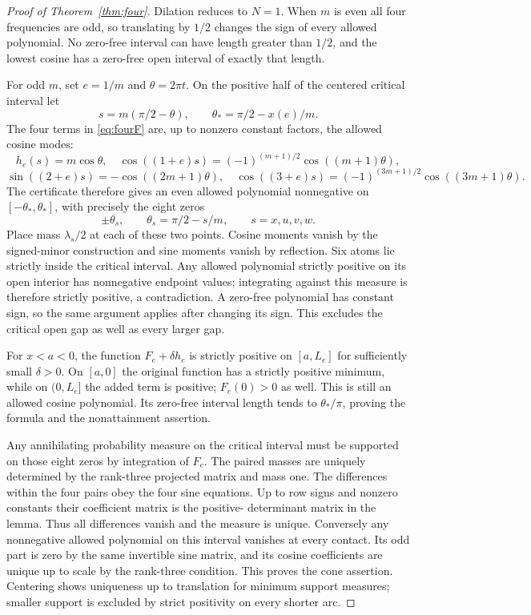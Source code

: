 \begin{proof}[Proof of Theorem~\ref{thm:four}]
Dilation reduces to $N=1$. When $m$ is even all four frequencies are odd,
so translating by $1/2$ changes the sign of every allowed polynomial.
No zero-free interval can have length greater than $1/2$, and the lowest
cosine has a zero-free open interval of exactly that length.

For odd $m$, set $e=1/m$ and $\theta=2\pi t$. On the positive half of
the centered critical interval let
\[
 s=m(\pi/2-\theta),\qquad
 \theta_* =\pi/2-x(e)/m.
\]
The four terms in \eqref{eq:fourF} are, up to nonzero constant factors,
the allowed cosine modes:
\[
 h_e(s)=m\cos\theta,
 \quad \cos((1+e)s)=(-1)^{(m+1)/2}\cos((m+1)\theta),
\]
\[
 \sin((2+e)s)=-\cos((2m+1)\theta),
 \quad \cos((3+e)s)=(-1)^{(3m+1)/2}\cos((3m+1)\theta).
\]
The certificate therefore gives an even allowed polynomial nonnegative on
$[-\theta_*,\theta_*]$, with precisely the eight zeros
\[
 \pm\theta_s,\qquad \theta_s=\pi/2-s/m,
 \qquad s=x,u,v,w.
\]
Place mass $\lambda_s/2$ at each of these two points. Cosine moments vanish
by the signed-minor construction and sine moments vanish by reflection.
Six atoms lie strictly inside the critical interval. Any allowed polynomial
strictly positive on its open interior has nonnegative endpoint values;
integrating against this measure is therefore strictly positive, a
contradiction. A zero-free polynomial has constant sign, so the same
argument applies after changing its sign. This excludes the critical open
gap as well as every larger gap.

For $x<a<0$, the function $F_e+\delta h_e$ is strictly positive on
$[a,L_e]$ for sufficiently small $\delta>0$. On $[a,0]$ the original
function has a strictly positive minimum, while on $(0,L_e]$ the added
term is positive; $F_e(0)>0$ as well. This is still an allowed cosine
polynomial. Its zero-free interval length tends to $\theta_*/\pi$, proving
the formula and the nonattainment assertion.

Any annihilating probability measure on the critical interval must be
supported on those eight zeros by integration of $F_e$. The paired masses
are uniquely determined by the rank-three projected matrix and mass one.
The differences within the four pairs obey the four sine equations. Up to
row signs and nonzero constants their coefficient matrix is the positive-
determinant matrix in the lemma. Thus all differences vanish and the
measure is unique. Conversely any nonnegative allowed polynomial on this
interval vanishes at every contact. Its odd part is zero by the same
invertible sine matrix, and its cosine coefficients are unique up to scale
by the rank-three condition. This proves the cone assertion. Centering
shows uniqueness up to translation for minimum support measures; smaller
support is excluded by strict positivity on every shorter arc.


\end{proof}

